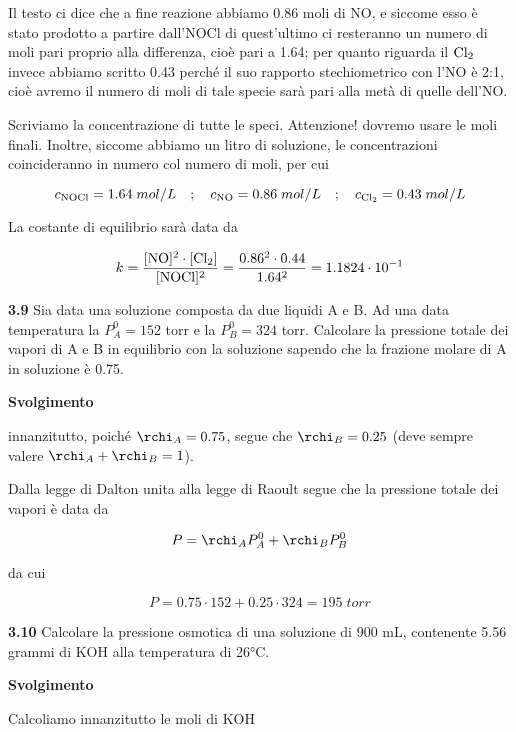 Il testo ci dice che a fine reazione abbiamo 0.86 moli di NO, e siccome esso è stato prodotto a partire dall'NOCl di quest'ultimo ci resteranno un numero di moli pari proprio alla differenza, cioè pari a 1.64; per quanto riguarda il $\rm Cl_2$ invece abbiamo scritto 0.43 perché il suo rapporto stechiometrico con l'NO è 2:1, cioè avremo il numero di moli di tale specie sarà pari alla metà di quelle dell'NO.

Scriviamo la concentrazione di tutte le speci. Attenzione! dovremo usare le moli finali. Inoltre, siccome abbiamo un litro di soluzione, le concentrazioni coincideranno in numero col numero di moli, per cui

$$c_{\rm NOCl}=1.64\;mol/L
\quad;\quad
c_{\rm NO}=0.86\;mol/L
\quad;\quad
c_{\rm Cl_2}=0.43\;mol/L$$

La costante di equilibrio sarà data da

$$k=\rm \frac{[NO]^2 \cdot [Cl_2]}{[NOCl]^2}
=\frac{0.86^2 \cdot 0.44}{1.64^2}=1.1824 \cdot 10^{-1}$$

\vspace{0.2cm}\textbf{3.9} Sia data una soluzione composta da due liquidi A e B. Ad una data temperatura la $P^0_A = 152$ torr
e la $P^0_B = 324$ torr. Calcolare la pressione totale dei vapori di A e B in equilibrio con la soluzione sapendo che la frazione molare di A in soluzione è 0.75.

\vspace{0.2cm}\large\textbf{Svolgimento}\normalsize

\vspace{0.2cm}innanzitutto, poiché $\rchi_A=0.75$, segue che $\rchi_B=0.25$ (deve sempre valere $\rchi_A + \rchi_B =1$).

Dalla legge di Dalton unita alla legge di Raoult segue che la pressione totale dei vapori è data da

$$P=\rchi_A P_A^0 + \rchi_B P_B^0$$

da cui 

$$P=0.75 \cdot 152 + 0.25 \cdot 324=195\;torr$$

\vspace{0.2cm}\textbf{3.10} Calcolare la pressione osmotica di una soluzione di 900 mL, contenente 5.56 grammi di KOH alla temperatura di 26°C.

\vspace{0.2cm}\large\textbf{Svolgimento}\normalsize

\vspace{0.2cm}Calcoliamo innanzitutto le moli di KOH

